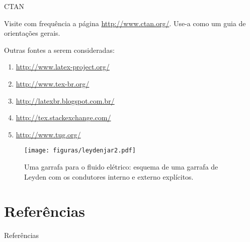 \documentclass[aspectratio=169]{beamer}
\begin{document}
\begin{frame}{CTAN}

Visite com frequência a página \url{http://www.ctan.org/}. 
Use-a como um guia de orientações gerais.
\vspace{0.7cm}

Outras fontes a serem consideradas:
\begin{enumerate}
 \item \url{http://www.latex-project.org/}
 \item \url{http://www.tex-br.org/}
 \item \url{http://latexbr.blogspot.com.br/}
 \item \url{http://tex.stackexchange.com/}
 \item \url{http://www.tug.org/}
\end{enumerate}

\end{frame}

\begin{frame}

\begin{figure}[hbtp]
	\centering
	\texttt{[image: figuras/leydenjar2.pdf]}
	\caption{Uma garrafa para o fluido elétrico: esquema de uma garrafa de Leyden com os condutores interno e externo explícitos.} 
	\label{fig:lydenjar2} 
\end{figure}

\end{frame}


\section{Referências}


\begin{frame}[allowframebreaks]{Referências}
\printbibliography
%
\end{frame}

\end{document}
